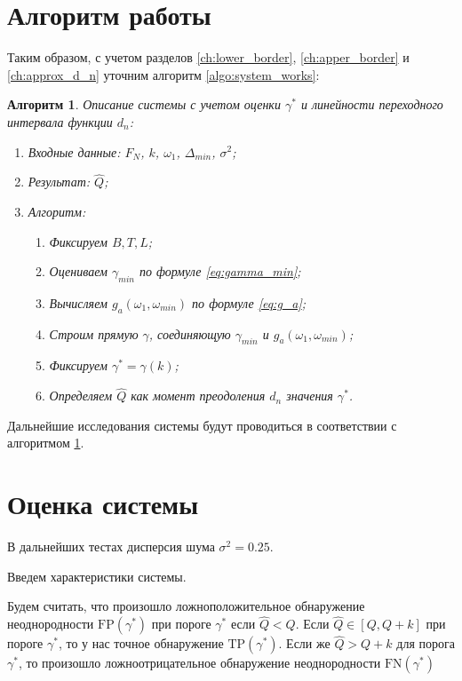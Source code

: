 \documentclass[specialist, substylefile = spbu.rtx,
			   subf, href, 12pt]{disser}
\newtheorem{algorithm}{Алгоритм}
\begin{document}
\section{Алгоритм работы}
Таким образом, с учетом разделов \ref{ch:lower_border}, \ref{ch:apper_border} и \ref{ch:approx_d_n} уточним алгоритм \ref{algo:system_works}:

\begin{algorithm}\label{algo:system_works_final}
	Описание системы с учетом оценки $ \gamma^* $ и линейности переходного интервала функции $ d_n $:
	\begin{enumerate}
		\item Входные данные: $ F_N $, $ k $, $ \omega_1 $, $ \Delta_{min} $, $ \sigma^2 $;
		\item Результат: $ \hat{Q }$;
		\item Алгоритм:
		\begin{enumerate}
			\item Фиксируем $ B, T, L $;
			\item Оцениваем $ \gamma_{min} $ по формуле \eqref{eq:gamma_min};
			\item Вычисляем $ g_a(\omega_1, \omega_{min}) $ по формуле \eqref{eq:g_a};
			\item Строим прямую $ \gamma $, соединяющую $ \gamma_{min} $ и $ g_a(\omega_1, \omega_{min}) $;
			\item Фиксируем $ \gamma^* = \gamma(k) $;
			\item Определяем $ \hat{Q} $ как момент преодоления $ d_n $ значения $ \gamma^* $.
		\end{enumerate}	
	\end{enumerate}
\end{algorithm}

Дальнейшие исследования системы будут проводиться в соответствии с алгоритмом \ref{algo:system_works_final}.

\section{Оценка системы}
В дальнейших тестах дисперсия шума $ \sigma^2 = 0.25 $. 

Введем характеристики системы.

Будем считать, что произошло ложноположительное обнаружение неоднородности $ \mathrm{FP}(\gamma^*) $ при пороге $ \gamma^* $ если $ \hat{Q} < Q $. Если $ \hat{Q} \in [Q, Q+k] $ при пороге $ \gamma^* $, то у нас точное обнаружение $ \mathrm{TP}(\gamma^*) $. Если же $ \hat{Q} > Q+k $ для порога $ \gamma^* $, то произошло ложноотрицательное обнаружение неоднородности $ \mathrm{FN}(\gamma^*) $
\end{document}
